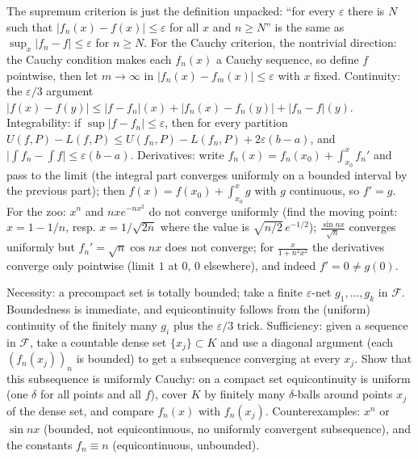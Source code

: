 \documentclass[11pt,a4paper]{article}
\begin{document}

The supremum criterion is just the definition unpacked: ``for every \(\varepsilon\) there is \(N\) such that \(\lvert f_n(x)-f(x)\rvert\le\varepsilon\) for all \(x\) and \(n\ge N\)'' is the same as \(\sup_x\lvert f_n-f\rvert\le\varepsilon\) for \(n\ge N\). For the Cauchy criterion, the nontrivial direction: the Cauchy condition makes each \(f_n(x)\) a Cauchy sequence, so define \(f\) pointwise, then let \(m\to\infty\) in \(\lvert f_n(x)-f_m(x)\rvert\le\varepsilon\) with \(x\) fixed.
Continuity: the \(\varepsilon/3\) argument \(\lvert f(x)-f(y)\rvert\le \lvert f-f_n\rvert(x)+\lvert f_n(x)-f_n(y)\rvert+\lvert f_n-f\rvert(y)\). Integrability: if \(\sup\lvert f-f_n\rvert\le\varepsilon\), then for every partition \(U(f,P)-L(f,P)\le U(f_n,P)-L(f_n,P)+2\varepsilon(b-a)\), and \(\lvert\int f_n-\int f\rvert\le\varepsilon(b-a)\).
Derivatives: write \(f_n(x)=f_n(x_0)+\int_{x_0}^x f_n'\) and pass to the limit (the integral part converges uniformly on a bounded interval by the previous part); then \(f(x)=f(x_0)+\int_{x_0}^x g\) with \(g\) continuous, so \(f'=g\). For the zoo: \(x^n\) and \(nxe^{-nx^2}\) do not converge uniformly (find the moving point: \(x=1-1/n\), resp. \(x=1/\sqrt{2n}\) where the value is \(\sqrt{n/2}\,e^{-1/2}\)); \(\frac{\sin nx}{\sqrt n}\) converges uniformly but \(f_n'=\sqrt n\cos nx\) does not converge; for \(\frac{x}{1+n^2x^2}\) the derivatives converge only pointwise (limit \(1\) at \(0\), \(0\) elsewhere), and indeed \(f'=0\ne g(0)\).

Necessity: a precompact set is totally bounded; take a finite \(\varepsilon\)-net \(g_1,\dots,g_k\) in \(\mathcal F\). Boundedness is immediate, and equicontinuity follows from the (uniform) continuity of the finitely many \(g_i\) plus the \(\varepsilon/3\) trick.
Sufficiency: given a sequence in \(\mathcal F\), take a countable dense set \(\{x_j\}\subset K\) and use a diagonal argument (each \((f_n(x_j))_n\) is bounded) to get a subsequence converging at every \(x_j\).
Show that this subsequence is uniformly Cauchy: on a compact set equicontinuity is uniform (one \(\delta\) for all points and all \(f\)), cover \(K\) by finitely many \(\delta\)-balls around points \(x_j\) of the dense set, and compare \(f_n(x)\) with \(f_n(x_j)\). Counterexamples: \(x^n\) or \(\sin nx\) (bounded, not equicontinuous, no uniformly convergent subsequence), and the constants \(f_n\equiv n\) (equicontinuous, unbounded).
\end{document}
